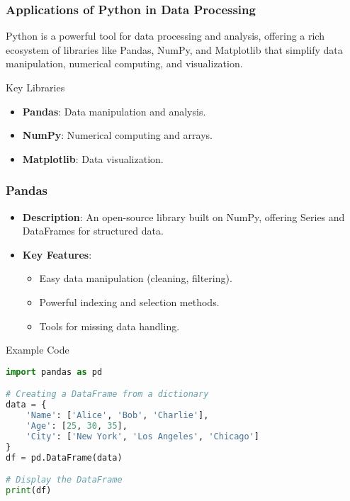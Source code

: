 \documentclass[aspectratio=169]{beamer}
\begin{document}
\begin{frame}
    \frametitle{Applications of Python in Data Processing}
    Python is a powerful tool for data processing and analysis, offering a rich ecosystem of libraries like Pandas, NumPy, and Matplotlib that simplify data manipulation, numerical computing, and visualization.

    \begin{block}{Key Libraries}
        \begin{itemize}
            \item \textbf{Pandas}: Data manipulation and analysis.
            \item \textbf{NumPy}: Numerical computing and arrays.
            \item \textbf{Matplotlib}: Data visualization.
        \end{itemize}
    \end{block}
\end{frame}

\begin{frame}[fragile]
    \frametitle{Pandas}
    \begin{itemize}
        \item \textbf{Description}: An open-source library built on NumPy, offering Series and DataFrames for structured data.
        \item \textbf{Key Features}:
        \begin{itemize}
            \item Easy data manipulation (cleaning, filtering).
            \item Powerful indexing and selection methods.
            \item Tools for missing data handling.
        \end{itemize}
    \end{itemize}

    \begin{block}{Example Code}
        \begin{lstlisting}[language=Python]
import pandas as pd

# Creating a DataFrame from a dictionary
data = {
    'Name': ['Alice', 'Bob', 'Charlie'],
    'Age': [25, 30, 35],
    'City': ['New York', 'Los Angeles', 'Chicago']
}
df = pd.DataFrame(data)

# Display the DataFrame
print(df)
        \end{lstlisting}
    \end{block}
\end{frame}
\end{document}
